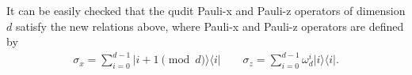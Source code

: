 \documentclass[11pt,letterpaper]{article}
\newcommand{\ket}[1]{|#1\rangle}
\newcommand{\ketbra}[2]{|#1\rangle\langle#2|}
\newcommand{\1}{\mathbb{1}}
\theoremstyle{definition}
\begin{document}
It can be easily checked that the qudit Pauli-x and Pauli-z operators of dimension $d$ satisfy the new relations 
above, where Pauli-x and Pauli-z operators are defined by
\begin{align}
	\sigma_x = \sum_{i=0}^{d-1} \ketbra{i+1 \pmod{d} }{i}  \quad \quad
	\sigma_z = \sum_{i=0}^{d-1} \omega_d^i \ketbra{i}{i}.
\end{align}
\end{document}
